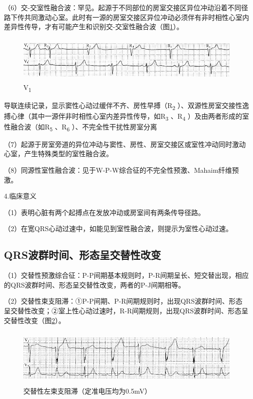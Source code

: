 （6）交-交室性融合波：罕见。起源于不同部位的房室交接区异位冲动沿着不同径路下传共同激动心室。此时有一源的房室交接区异位冲动必须伴有非时相性心室内差异性传导，才有可能产生和识别交-交室性融合波（图\ref{fig3-20}）。

\begin{figure}[!htbp]
 \centering
 \includegraphics[width=5.58333in,height=0.90625in]{./images/Image00070.jpg}
 \captionsetup{justification=centering}
 \caption{V\textsubscript{1}}
 \label{fig3-20}
  \end{figure} 
导联连续记录，显示窦性心动过缓伴不齐、房性早搏（R\textsubscript{2}
）、双源性房室交接性逸搏心律（其中一源伴非时相性心室内差异性传导，如R\textsubscript{3}
、R\textsubscript{4} ）及由两者形成的室性融合波（如R\textsubscript{5}
、R\textsubscript{6} ）、不完全性干扰性房室分离

（7）起源于房室旁道的异位冲动与窦性、房性、房室交接区或室性冲动同时激动心室，产生特殊类型的室性融合波。

（8）同源性室性融合波：见于W-P-W综合征的不完全性预激、Mahaim纤维预激。

4.临床意义

（1）表明心脏有两个起搏点在发放冲动或房室间有两条传导径路。

（2）在宽QRS心动过速中，如能见到室性融合波，则提示为室性心动过速。

\protect\hypertarget{text00009.htmlux5cux23subid62}{}{}

\subsection{QRS波群时间、形态呈交替性改变}

（1）交替性预激综合征：P-P间期基本规则时，P-R间期呈长、短交替出现，相应的QRS波群时间、形态呈交替性改变，两者的P-J间期相等。

（2）交替性束支阻滞：①P-P间期、P-R间期规则时，出现QRS波群时间、形态呈交替性改变；②室上性心动过速时，R-R间期规则，出现QRS波群时间、形态呈交替性改变（图\ref{fig3-21}）。

\begin{figure}[!htbp]
 \centering
 \includegraphics[width=5.58333in,height=1.11458in]{./images/Image00071.jpg}
 \captionsetup{justification=centering}
 \caption{交替性左束支阻滞（定准电压均为0.5mV）}
 \label{fig3-21}
  \end{figure} 

